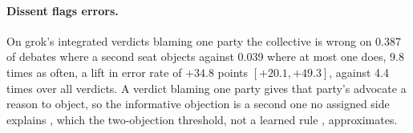 \paragraph{Dissent flags errors.}
On grok's integrated verdicts blaming one party the collective is wrong on 0.387 of
debates where a second seat objects against 0.039 where at most one does,
9.8 times as often, a lift in error rate of $+34.8$ points $[+20.1, +49.3]$,
against 4.4 times over all verdicts.
A verdict blaming one party gives that party's advocate a reason to
object, so the informative objection is a second one no assigned side
explains \citep{milgrom1986relying,lipman1995robust}, which the
two-objection threshold, not a learned rule \citep{he2026minoritysentinel},
approximates.
